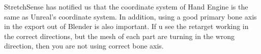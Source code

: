 \documentclass{uva-inf-article}
\begin{document}
StretchSense has notified us that the coordinate system of Hand Engine is the same as Unreal's coordinate system. In addition, using a good primary bone axis in the export out of Blender is also important. If u see the retarget working in the correct directions, but the mesh of each part are turning in the wrong direction, then you are not using correct bone axis.



\printbibliography



\end{document}
